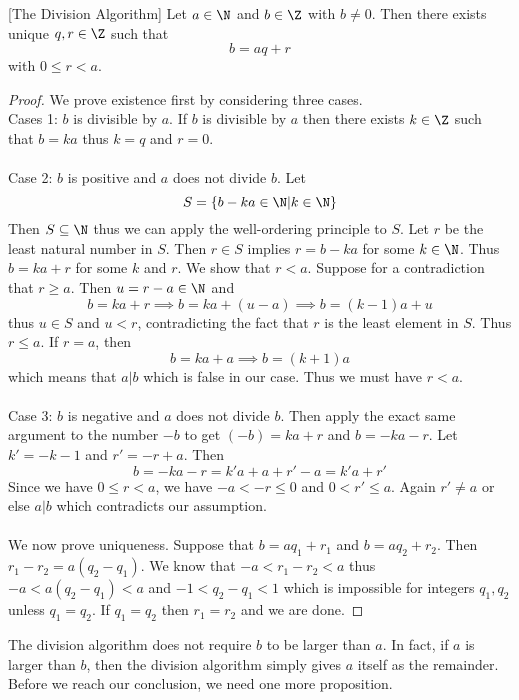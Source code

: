 \begin{thm}{}{}[The Division Algorithm] Let $a\in\N$ and $b\in\Z$ with $b\neq 0$. Then there exists unique $q,r\in\Z$ such that $$b=aq+r$$ with $0\leq r<a$. 
\end{thm}
\begin{proof}
We prove existence first by considering three cases. \\
Cases 1: $b$ is divisible by $a$.  If $b$ is divisible by $a$ then there exists $k\in\Z$ such that $b=ka$ thus $k=q$ and $r=0$. \\~\\
Case 2: $b$ is positive and $a$ does not divide $b$. Let $$S=\{b-ka\in\N|k\in\N\}$$ Then $S\subseteq\N$ thus we can apply the well-ordering principle to $S$. Let $r$ be the least natural number in $S$. Then $r\in S$ implies $r=b-ka$ for some $k\in\N$. Thus $b=ka+r$ for some $k$ and $r$. We show that $r<a$. Suppose for a contradiction that $r\geq a$. Then $u=r-a\in\N$ and $$b=ka+r\implies b=ka+(u-a)\implies b=(k-1)a+u$$ thus $u\in S$ and $u<r$, contradicting the fact that $r$ is the least element in $S$. Thus $r\leq a$. If $r=a$, then $$b=ka+a\implies b=(k+1)a$$ which means that $a|b$ which is false in our case. Thus we must have $r<a$. \\~\\
Case 3: $b$ is negative and $a$ does not divide $b$. Then apply the exact same argument to the number $-b$ to get $(-b)=ka+r$ and $b=-ka-r$. Let $k'=-k-1$ and $r'=-r+a$. Then $$b=-ka-r=k'a+a+r'-a=k'a+r'$$ Since we have $0\leq r<a$, we have $-a<-r\leq 0$ and $0<r'\leq a$. Again $r'\neq a$ or else $a|b$ which contradicts our assumption. \\~\\
We now prove uniqueness. Suppose that $b=aq_1+r_1$ and $b=aq_2+r_2$. Then $r_1-r_2=a(q_2-q_1)$. We know that $-a<r_1-r_2<a$ thus $-a<a(q_2-q_1)<a$ and $-1<q_2-q_1<1$ which is impossible for integers $q_1,q_2$ unless $q_1=q_2$. If $q_1=q_2$ then $r_1=r_2$ and we are done. 
\end{proof}

The division algorithm does not require $b$ to be larger than $a$. In fact, if $a$ is larger than $b$, then the division algorithm simply gives $a$ itself as the remainder. Before we reach our conclusion, we need one more proposition. 

